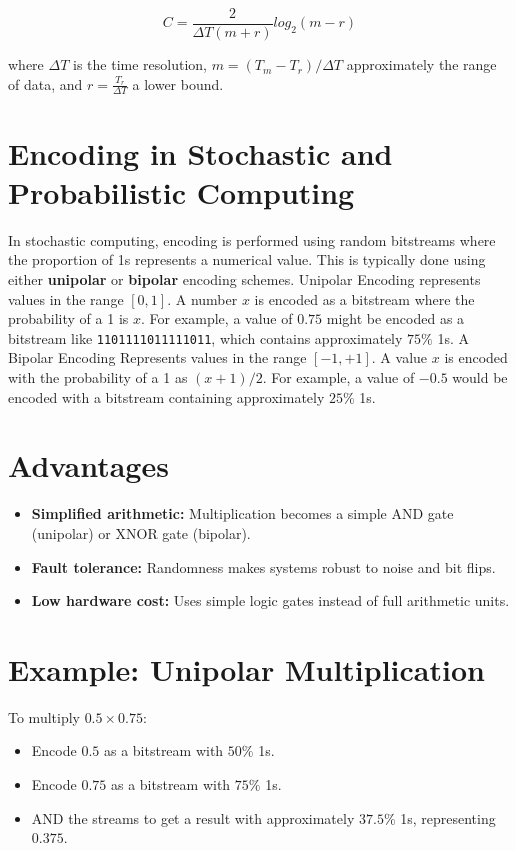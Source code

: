\documentclass{article}
\begin{document}
$$C=\frac{2}{\Delta T(m+ r)} log_2(m- r)$$

where $\Delta T$ is the time resolution, $m=(T_m-T_r)/\Delta T$ approximately the range of data, and $r=\frac{T_r}{\Delta T}$ a lower bound.

\section{Encoding in Stochastic and Probabilistic Computing}

In stochastic computing, encoding is performed using random bitstreams where the proportion of 1s represents a numerical value. This is typically done using either \textbf{unipolar} or \textbf{bipolar} encoding schemes.
Unipolar Encoding represents values in the range $[0, 1]$. A number $x$ is encoded as a bitstream where the probability of a 1 is $x$. For example, a value of $0.75$ might be encoded as a bitstream like \texttt{1101111011111011}, which contains approximately $75\%$ 1s. A Bipolar Encoding Represents values in the range $[-1, +1]$. A value $x$ is encoded with the probability of a 1 as $(x + 1)/2$. For example, a value of $-0.5$ would be encoded with a bitstream containing approximately $25\%$ 1s.

\section{Advantages}
\begin{itemize}
  \item \textbf{Simplified arithmetic:} Multiplication becomes a simple AND gate (unipolar) or XNOR gate (bipolar).
  \item \textbf{Fault tolerance:} Randomness makes systems robust to noise and bit flips.
  \item \textbf{Low hardware cost:} Uses simple logic gates instead of full arithmetic units.
\end{itemize}

\section{Example: Unipolar Multiplication}
To multiply $0.5 \times 0.75$:
\begin{itemize}
  \item Encode $0.5$ as a bitstream with $50\%$ 1s.
  \item Encode $0.75$ as a bitstream with $75\%$ 1s.
  \item AND the streams to get a result with approximately $37.5\%$ 1s, representing $0.375$.
\end{itemize}
\end{document}
